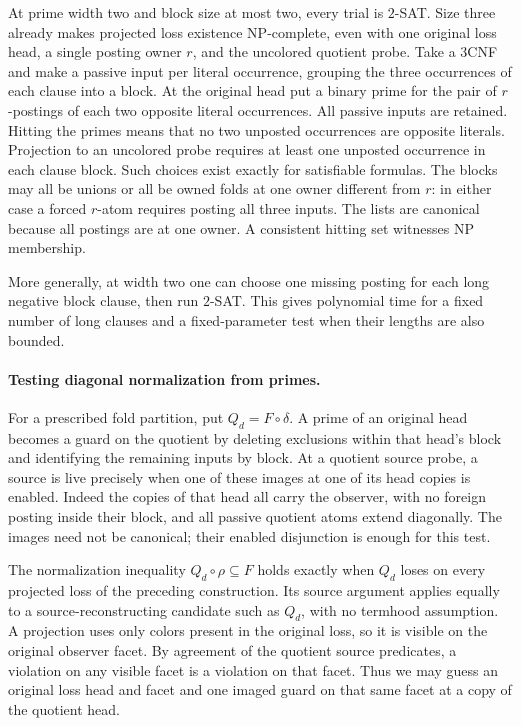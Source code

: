 At prime width two and block size at most
two, every trial is $2$-SAT. Size three
already makes projected loss existence
NP-complete, even with one original loss
head, a single posting owner $r$, and the
uncolored quotient probe. Take a $3$CNF
and make a passive input per literal
occurrence, grouping the three occurrences
of each clause into a block. At the original
head put a binary prime for the pair of
$r$-postings of each two opposite literal
occurrences. All passive inputs are retained.
Hitting the primes means that no two
unposted occurrences are opposite literals.
Projection to an uncolored probe requires
at least one unposted occurrence in each
clause block. Such choices exist exactly
for satisfiable formulas. The blocks may
all be unions or all be owned folds at
one owner different from $r$: in either
case a forced $r$-atom requires posting
all three inputs. The lists are canonical
because all postings are at one owner.
A consistent hitting set witnesses NP
membership.

More generally, at width two one can choose
one missing posting for each long negative
block clause, then run $2$-SAT. This gives
polynomial time for a fixed number of
long clauses and a fixed-parameter test
when their lengths are also bounded.

\paragraph{Testing diagonal normalization from primes.}
For a prescribed fold partition, put $Q_d=F\circ\delta$.
A prime of an original head becomes a guard on the
quotient by deleting exclusions within that head's
block and identifying the remaining inputs by block.
At a quotient source probe, a source is live precisely
when one of these images at one of its head copies
is enabled. Indeed the copies of that head all carry
the observer, with no foreign posting inside their
block, and all passive quotient atoms extend
diagonally. The images need not be canonical; their
enabled disjunction is enough for this test.

The normalization inequality $Q_d\circ\rho\subseteq F$
holds exactly when $Q_d$ loses on every projected
loss of the preceding construction. Its source
argument applies equally to a source-reconstructing
candidate such as $Q_d$, with no termhood assumption.
A projection uses only colors present in the original
loss, so it is visible on the original observer facet.
By agreement of the quotient source predicates, a
violation on any visible facet is a violation on that
facet. Thus we may guess an original loss head and
facet and one imaged guard on that same facet at a
copy of the quotient head.

